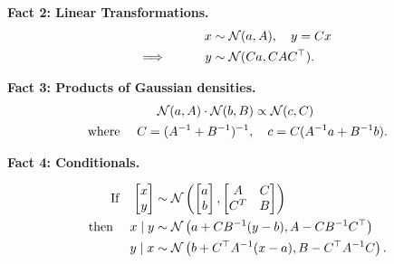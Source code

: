 \documentclass[10pt]{article}
\begin{document}
\begin{appendices}
{\bf  Fact 2: Linear Transformations.}
\begin{alignat}{2}
&\qquad&  x &\sim \mathcal{N}(a,A),\quad 
y =Cx \nonumber \nonumber \\
\implies & \qquad& y & \sim \mathcal{N}(Ca, CAC^\top ).
\label{eq:gfflin}
\end{alignat}




{\bf  Fact 3: Products of Gaussian densities.}
\label{eq:gffprod}
\begin{gather}
\mathcal{N}(a,A) \cdot \mathcal{N}(b,B) \propto \mathcal{N}(c,C)  \\
\text{ where } \quad C = (A^{-1}+B^{-1})^{-1}, \quad c = C(A^{-1} a +
B^{-1} b). \nonumber 
\end{gather}

{\bf  Fact 4: Conditionals.}

\begin{align}
\textrm{If} \quad 
  \begin{bmatrix} 
x \\ y
  \end{bmatrix} &\sim \mathcal{N} \left( 
    \begin{bmatrix}
      a \\ b
    \end{bmatrix}, 
    \begin{bmatrix}
      A & C \\ C^T & B
    \end{bmatrix}
\right) \nonumber \\ 
\text{ then }
\quad 
x\mid y &\sim \mathcal{N}\left(a+CB^{-1}(y-b), A-CB^{-1} C^\top\right) \nonumber  \\
  y \mid x &\sim \mathcal{N} \left(b+C^\top A^{-1}(x-a), B-C^\top A^{-1} C \right).
             \label{eq:gffcond}
\end{align}


\end{appendices}
\end{document}
